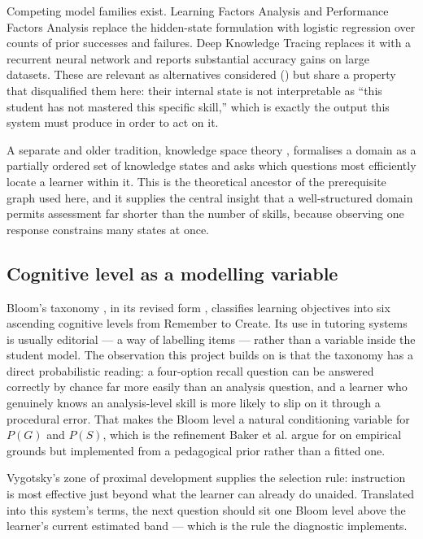 Competing model families exist. Learning Factors Analysis \cite{cen2006learning}
and Performance Factors Analysis \cite{pavlik2009performance} replace the
hidden-state formulation with logistic regression over counts of prior successes
and failures. Deep Knowledge Tracing \cite{piech2015deep} replaces it with a
recurrent neural network and reports substantial accuracy gains on large
datasets. These are relevant as alternatives considered
() but share a property that disqualified them here:
their internal state is not interpretable as ``this student has not mastered
this specific skill,'' which is exactly the output this system must produce in
order to act on it.

A separate and older tradition, knowledge space theory
\cite{doignon1985spaces,falmagne2011learning}, formalises a domain as a
partially ordered set of knowledge states and asks which questions most
efficiently locate a learner within it. This is the theoretical ancestor of the
prerequisite graph used here, and it supplies the central insight that a
well-structured domain permits assessment far shorter than the number of skills,
because observing one response constrains many states at once.

\subsection{Cognitive level as a modelling variable}

Bloom's taxonomy \cite{bloom1956taxonomy}, in its revised form
\cite{anderson2001revised}, classifies learning objectives into six ascending
cognitive levels from Remember to Create. Its use in tutoring systems is usually
editorial --- a way of labelling items --- rather than a variable inside the
student model. The observation this project builds on is that the taxonomy has a
direct probabilistic reading: a four-option recall question can be answered
correctly by chance far more easily than an analysis question, and a learner who
genuinely knows an analysis-level skill is more likely to slip on it through a
procedural error. That makes the Bloom level a natural conditioning variable for
$P(G)$ and $P(S)$, which is the refinement Baker et al. \cite{baker2008more}
argue for on empirical grounds but implemented from a pedagogical prior rather
than a fitted one.

Vygotsky's zone of proximal development \cite{vygotsky1978mind} supplies the
selection rule: instruction is most effective just beyond what the learner can
already do unaided. Translated into this system's terms, the next question
should sit one Bloom level above the learner's current estimated band --- which
is the rule the diagnostic implements.

